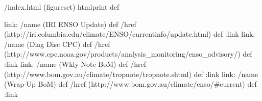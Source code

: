 /index.html {(figureset) htmlprint} def
\begin{ingrid}
link:
/name (IRI ENSO Update) def /href (http://iri.columbia.edu/climate/ENSO/currentinfo/update.html) def
:link
link:
/name (Diag Disc CPC) def
/href (http://www.cpc.noaa.gov/products/analysis_monitoring/enso_advisory/) def
:link
link:
/name (Wkly Note BoM) def
/href (http://www.bom.gov.au/climate/tropnote/tropnote.shtml) def
:link
link:
/name (Wrap-Up BoM) def
/href (http://www.bom.gov.au/climate/enso/#current) def
:link
\end{ingrid}
